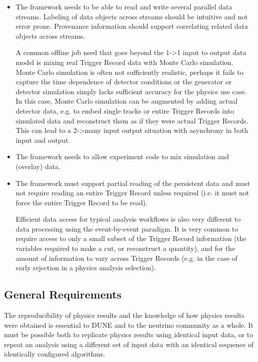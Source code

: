 \documentclass[../main-v1.tex]{subfiles}
\begin{document}
\begin{itemize}
\item The framework needs to be able to read and write several parallel data streams.  Labeling of data objects across streams should be intuitive and not error prone.  Provenance information should support correlating related data objects across streams.

A common offline job need that goes beyond the 1->1 input to output data model is mixing real Trigger Record data with Monte Carlo simulation.  Monte Carlo simulation is often not sufficiently realistic, perhaps it fails to capture the time dependence of detector conditions or the generator or detector simulation simply lacks sufficient accuracy for the physics use case.  In this case, Monte Carlo simulation can be augmented by adding actual detector data, e.g. to embed single tracks or entire Trigger Records into simulated data and reconstruct them as if they were actual Trigger Records.  This can lead to a 2->many input output situation with asynchrony in both input and output. 

\item The framework needs to allow experiment code to mix simulation and (overlay) data.


\item The framework must support partial reading of the persistent data and must not require reading an entire Trigger Record unless required (i.e. it must not force the entire Trigger Record to be read).

Efficient data access for typical analysis workflows is also very different to data processing using the event-by-event paradigm. It is very common to require access to only a small subset of the Trigger Record information (the variables required to make a cut, or reconstruct a quantity), and for the amount of information to vary across Trigger Records (e.g. in the case of early rejection in a physics analysis selection).

\end{itemize}




\subsection{General Requirements} %

The reproducibility of physics results and the knowledge of how physics results were obtained is essential to DUNE and to the neutrino community as a whole.  It must be possible both to replicate physics results using identical input data, or to repeat an analysis using a different set of input data with an identical sequence of identically configured algorithms. 
\end{document}
